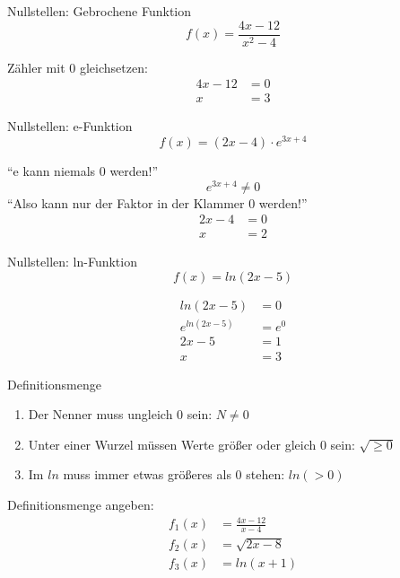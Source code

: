 \documentclass[paper=a6,landscape,ngerman,twoside=true,fontsize=12pt]{scrartcl}
\begin{document}
\begin{frage}
	Nullstellen: Gebrochene Funktion
	\[
	f(x)=\frac{4x-12}{x^2-4}
	\]
\end{frage}
\begin{antwort}
	Zähler mit 0 gleichsetzen:
	\begin{align*}
	4x-12&=0 \\
	x&=3
	\end{align*}
\end{antwort}
\begin{frage}
	Nullstellen: e-Funktion
	\[
	f(x)=(2x-4)\cdot{e^{3x+4}}
	\]
\end{frage}
\begin{antwort}
	"`e kann niemals 0 werden!"'
	\[
	{e^{3x+4}}\neq0
	\]
	"`Also kann nur der Faktor in der Klammer 0 werden!"'
	\begin{align*}
	2x-4&=0 \\
	x&=2
	\end{align*}
\end{antwort}
\begin{frage}
	Nullstellen: ln-Funktion
	\[
	f(x)=ln(2x-5)
	\]
\end{frage}
\begin{antwort}
	\begin{align*}
		ln(2x-5)&=0\\
		{e^{ln(2x-5)}}&=e^0\\
		2x-5&=1\\
		x&=3
	\end{align*}

\end{antwort}
\begin{frage}
	Definitionsmenge
\end{frage}
\begin{antwort}
	\begin{enumerate}
		\item Der Nenner muss ungleich 0 sein: $N \neq 0$
		\item Unter einer Wurzel müssen Werte größer oder gleich 0 sein: $\sqrt{\ge 0}$
		\item Im $ln$ muss immer etwas größeres als 0 stehen: $ln(>0)$
	\end{enumerate}
\end{antwort}
\begin{frage}
	Definitionsmenge angeben:
	\begin{align*}
	     f_1(x)&=\frac{4x-12}{x-4} \\
		 f_2(x)&=\sqrt{2x-8}\\
		 f_3(x)&=ln(x+1)
	\end{align*}
\end{frage}
\end{document}

